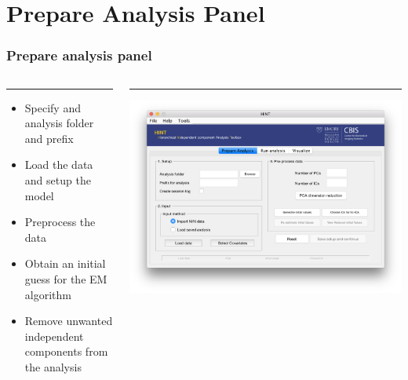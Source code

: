 \documentclass[11pt]{beamer}
\begin{document}
\section{Prepare Analysis Panel}

\begin{frame}
\frametitle{Prepare analysis panel}
\begin{columns}[T] %
	\begin{column}{.48\textwidth}
		\color{red}\rule{\linewidth}{0pt}
		
		\begin{itemize}
\item Specify and analysis folder and prefix
\item Load the data and setup the model
\item Preprocess the data
\item Obtain an initial guess for the EM algorithm
\item Remove unwanted independent components from the analysis
\end{itemize}
		
	\end{column}%
	\hfill%
	\begin{column}{.51\textwidth}
		\color{blue}\rule{\linewidth}{0pt}
		\includegraphics[width=1.2\linewidth]{figs/panel1empty}
	\end{column}%
\end{columns}
\end{frame}

\end{document}
